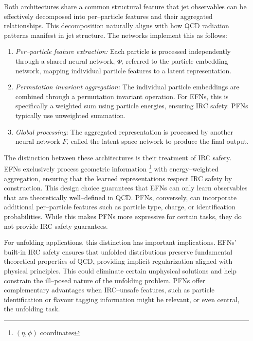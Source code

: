         Both architectures share a common structural feature that jet observables can be effectively decomposed into per--particle features and their aggregated relationships.
        This decomposition naturally aligns with how QCD radiation patterns manifest in jet structure.
        The networks implement this as follows:
        \begin{enumerate}
            \item \emph{Per--particle feature extraction:}
                Each particle is processed independently through a shared neural network, \(\Phi\), referred to the particle embedding network, mapping individual particle features to a latent representation.
            \item \emph{Permutation invariant aggregation:}
                The individual particle embeddings are combined through a permutation invariant operation.
                For EFNs, this is specifically a weighted sum using particle energies, ensuring IRC safety.
                PFNs typically use unweighted summation.
            \item \emph{Global processing:}
                The aggregated representation is processed by another neural network \(F\), called the latent space network to produce the final output.
        \end{enumerate}
        The distinction between these architectures is their treatment of IRC safety.
        EFNs exclusively process geometric information \footnote{\((\eta,\phi)\) coordinates} with energy--weighted aggregation, ensuring that the learned representations respect IRC safety by construction.
        This design choice guarantees that EFNs can only learn observables that are theoretically well--defined in QCD.
        PFNs, conversely, can incorporate additional per--particle features such as particle type, charge, or identification probabilities.
        While this makes PFNs more expressive for certain tasks, they do not provide IRC safety guarantees.
        
        For unfolding applications, this distinction has important implications.
        EFNs' built-in IRC safety ensures that unfolded distributions preserve fundamental theoretical properties of QCD, providing implicit regularization aligned with physical principles.
        This could eliminate certain unphysical solutions and help constrain the ill--posed nature of the unfolding problem.
        PFNs offer complementary advantages when IRC--unsafe features, such as particle identification or flavour tagging information might be relevant, or even central, the unfolding task.
        
